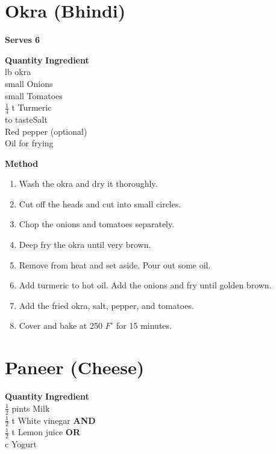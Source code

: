 \section{Okra (Bhindi)}
{\bf Serves 6}

\begin{tabbing}
\hspace{1.0cm}  \={\bf Quantity}   \hspace{3.0cm} \={\bf Ingredient}\\
 lb\> okra \\
 small \>Onions \\
 small \>Tomatoes    \\
\>$\frac{1}{4}$ t \>Turmeric \\
\>to taste\>Salt \\
\>\>Red pepper (optional) \\
\>\>Oil for frying\\
\end{tabbing}

{\bf Method}
\begin{enumerate}
\item  Wash the okra and dry it thoroughly.
\item Cut off the heads and cut into small circles.
\item Chop the onions and tomatoes separately.
\item Deep fry the okra until very brown.
\item  Remove from heat and set aside.  Pour out some oil.
\item Add turmeric to hot oil.  Add the onions and fry until golden brown.
\item Add the fried okra, salt, pepper, and tomatoes.
\item Cover and bake at 250 $F^\circ$ for 15 minutes.
\end{enumerate}

\section{Paneer (Cheese)}

\begin{tabbing}
\hspace{1.0cm}  \={\bf Quantity}   \hspace{3.0cm} \={\bf Ingredient}\\
 $\frac{1}{2}$ pints \>Milk\\
\>$\frac{1}{2}$ t       \>White vinegar {\bf AND}\\
\>$\frac{1}{2}$ t       \>Lemon juice {\bf OR}\\
 c                   \>Yogurt\\
\end{tabbing}

